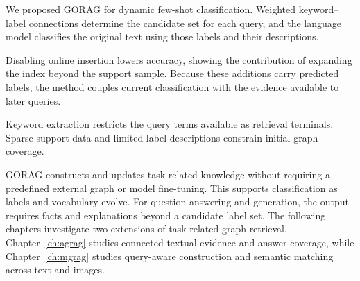 We proposed GORAG for dynamic few-shot classification. Weighted keyword--label connections determine the candidate set for each query, and the language model classifies the original text using those labels and their descriptions.

Disabling online insertion lowers accuracy, showing the contribution of expanding the index beyond the support sample. Because these additions carry predicted labels, the method couples current classification with the evidence available to later queries.

Keyword extraction restricts the query terms available as retrieval terminals. Sparse support data and limited label descriptions constrain initial graph coverage.

GORAG constructs and updates task-related knowledge without requiring a predefined external graph or model fine-tuning. This supports classification as labels and vocabulary evolve. For question answering and generation, the output requires facts and explanations beyond a candidate label set. The following chapters investigate two extensions of task-related graph retrieval. Chapter~\ref{ch:agrag} studies connected textual evidence and answer coverage, while Chapter~\ref{ch:mgrag} studies query-aware construction and semantic matching across text and images.
